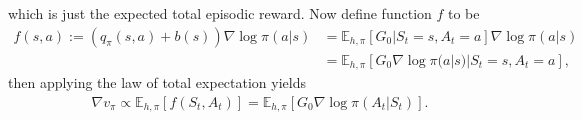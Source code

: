 \documentclass[a4paper]{report}
\theoremstyle{definition}
\theoremstyle{plain}
\begin{document}
which is just the expected total episodic reward.
%
Now define function $f$ to be
\begin{subequations}
\begin{align}
  f(s, a) := (q_{\pi}(s, a) + b(s))\nabla \log \pi(a | s) &= \mathbb{E}_{h,\pi} \left[ G_{0} | S_{t} = s, A_{t} = a \right] \nabla \log \pi(a | s) \\
  &= \mathbb{E}_{h,\pi} \left[ G_{0} \nabla \log \pi(a | s) | S_{t} = s, A_{t} = a \right] ,
\end{align}
\end{subequations}
then applying the law of total expectation yields
\begin{align}
  \nabla v_{\pi} \propto \mathbb{E}_{h,\pi}[f(S_{t}, A_{t})] =  \mathbb{E}_{h, \pi} \left[ G_{0} \nabla \log \pi(A_{t} | S_{t}) \right] .
\end{align}
\end{document}
